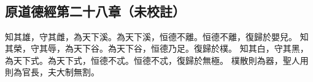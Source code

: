 ﻿%
%

\chapter{~}

\section{原道德經第二十八章（未校註）}

\begin{withgezhu}

\zhsong


\textcolor{tongjia-color}{知其雄，守其雌，為天下溪。為天下溪，恒德不離。恒德不離，復歸於嬰兒。}
\textcolor{tongjia-color}{知其榮，守其辱，為天下谷。為天下谷，恒德乃足}。復歸於樸。
\textcolor{tongjia-color}{知其白，守其黑，為天下式。為天下式，恒德不忒}。恒德不忒，復歸於無極。
樸散則為器，聖人用則為官長，夫大制無割。

\end{withgezhu}
